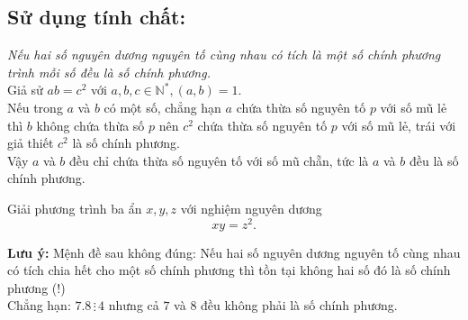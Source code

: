 \subsection{Sử dụng tính chất:} \textit{Nếu hai số nguyên dương nguyên tố cùng nhau có tích là một số chính phương trình mỗi số đều là số chính phương.}\\
Giả sử $ab=c^2$ với $a,b,c\in\mathbb{N^*}, (a,b)=1.$\\
Nếu trong $a$ và $b$ có một số, chẳng hạn $a$ chứa thừa số nguyên tố $p$ với số mũ lẻ thì $b$ không chứa thừa số $p$ nên $c^2$ chứa thừa số nguyên tố $p$ với số mũ lẻ, trái với giả thiết $c^2$ là số chính phương.\\
Vậy $a$ và $b$ đều chỉ chứa thừa số nguyên tố với số mũ chẵn, tức là $a$ và $b$ đều là số chính phương.
\begin{vd}
Giải phương trình ba ẩn $x,y,z$ với nghiệm nguyên dương
\[xy=z^2.\tag{1}\]
\end{vd}
\textbf{Lưu ý:} Mệnh đề sau không đúng: Nếu hai số nguyên dương nguyên tố cùng nhau có tích chia hết cho một số chính phương thì tồn tại không hai số đó là số chính phương (!)\\
Chẳng hạn: $7.8\, \vdots \, 4$ nhưng cả $7$ và $8$ đều không phải là số chính phương.
